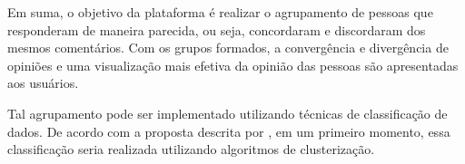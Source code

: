 Em suma, o objetivo da plataforma é realizar o agrupamento de pessoas que responderam de maneira parecida, ou seja, 
concordaram e discordaram dos mesmos comentários. Com os grupos formados, a convergência e divergência 
de opiniões e uma visualização mais efetiva da opinião das pessoas são apresentadas aos usuários. 

Tal agrupamento pode ser implementado utilizando técnicas de classificação de dados.
De acordo com a proposta descrita por , 
em um primeiro momento, essa classificação seria realizada utilizando algoritmos de clusterização. 